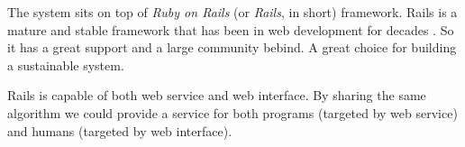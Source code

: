 The system sits on top of \emph{Ruby on Rails}
(or \emph{Rails}, in short) \cite{rails} framework.
Rails is a mature and stable framework that has been in
web development for decades \cite[]{railsd}. So it has a great support
and a large community bebind. A great choice for building a sustainable
system.

Rails is capable of both web service and web interface.
By sharing the same algorithm we could provide a service
for both programs (targeted by web service) and humans
(targeted by web interface).
